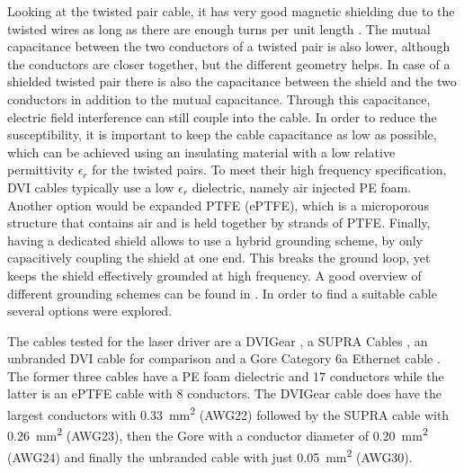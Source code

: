 Looking at the twisted pair cable, it has very good magnetic shielding due to the twisted wires as long as there are enough turns per unit length \cite{ott_electromagnetic, twisted_pair_magnetic_shielding}. The mutual capacitance between the two conductors of a twisted pair is also lower, although the conductors are closer together, but the different geometry helps.  In case of a shielded twisted pair there is also the capacitance between the shield and the two conductors in addition to the mutual capacitance. Through this capacitance, electric field interference can still couple into the cable. In order to reduce the susceptibility, it is important to keep the cable capacitance as low as possible, which can be achieved using an insulating material with a low relative permittivity $\epsilon_r$ for the twisted pairs. To meet their high frequency specification, DVI cables typically use a low $\epsilon_r$ dielectric, namely air injected PE foam. Another option would be expanded PTFE (ePTFE), which is a microporous structure that contains air and is held together by strands of PTFE. Finally, having a dedicated shield allows to use a hybrid grounding scheme, by only capacitively coupling the shield at one end. This breaks the ground loop, yet keeps the shield effectively grounded at high frequency. A good overview of different grounding schemes can be found in \citep[p. 72]{ott_electromagnetic}. In order to find a suitable cable several options were explored.

The cables tested for the laser driver are a DVIGear  \cite{dvigear_SHR}, a SUPRA Cables  \cite{supra_dvi_cable}, an unbranded DVI cable for comparison and a Gore  Category 6a Ethernet cable \cite{gore_cat6}. The former three cables have a PE foam dielectric and \num{17} conductors while the latter is an ePTFE cable with \num{8} conductors. The DVIGear  cable does have the largest conductors with \qty{0.33}{\square\mm} (AWG22) followed by the SUPRA cable with \qty{0.26}{\square\mm} (AWG23), then the Gore  with a conductor diameter of \qty{0.20}{\square\mm} (AWG24) and finally the unbranded cable with just \qty{0.05}{\square\mm} (AWG30).

